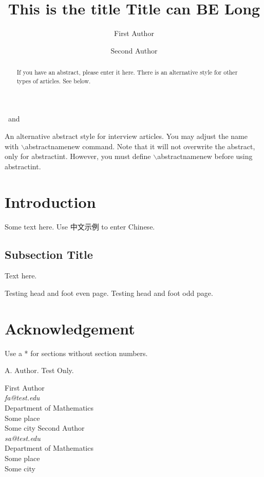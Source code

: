 \documentclass{iccmpdfwf}
\def\textzh#1{{\textzhfamily #1}}%
\theoremstyle{plain}
\theoremstyle{definition}
\begin{document}
\begin{frontmatter}

\title{This is the title Title can BE Long}

\author{First Author}%
\ and %
\author{Second Author}%



\begin{abstract}
If you have an abstract, please enter it here. There is an alternative style for other types of articles. See below.
\end{abstract}

\def\abstractnamenew{Biography.}
\begin{abstractint}
An alternative abstract style for interview articles. You may adjust the name with $\backslash$abstractnamenew command. Note that it will not overwrite the abstract, only for abstractint. However, you must define $\backslash$abstractnamenew before using abstractint.
\end{abstractint}

\end{frontmatter}
%
\tableofcontents
 
\section{Introduction} \label{secIn}
Some text here. Use \textzh{中文示例} to enter Chinese.

\subsection{Subsection Title}
Text here. \cite{t1}

\newpage
Testing head and foot even page.
\newpage
Testing head and foot odd page.
\section*{Acknowledgement}
Use a * for sections without section numbers.


\begin{thebibliography}{999}
 A. Author. Test Only.
\end{thebibliography}

\begin{flushright}
First Author\\
{\it fa@test.edu}\\
Department of Mathematics\\
Some place\\
Some city
\vskip 0.5pc
Second Author\\
{\it sa@test.edu}\\
Department of Mathematics\\
Some place\\
Some city
\end{flushright}
\end{document}
